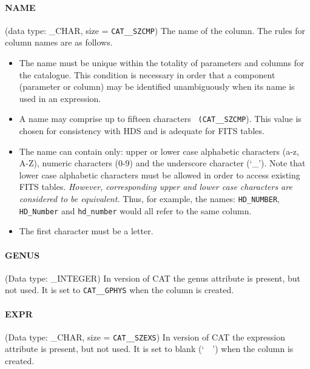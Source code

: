 \paragraph{NAME}
(data type: \_CHAR, size = {\tt CAT\_\_SZCMP})
The name of the column. The rules for column names are as follows.

\begin{itemize}

  \item The name must be unique within the totality of parameters and
   columns for the catalogue. This condition is necessary in order that
   a component (parameter or column) may be identified unambiguously
   when its name is used in an expression.

  \item A name may comprise up to fifteen characters {\tt
   (CAT\_\_SZCMP}). This value is chosen for consistency with HDS and
   is adequate for FITS tables.

  \item The name can contain only: upper or lower case alphabetic
   characters (a-z, A-Z), numeric characters (0-9) and the underscore
   character (`\_'). Note that lower case alphabetic characters must
   be allowed in order to access existing FITS tables. {\it However,
   corresponding upper and lower case characters are considered to be
   equivalent.} Thus, for example, the names: {\tt HD\_NUMBER}, {\tt
   HD\_Number} and {\tt hd\_number} would all refer to the same column.

  \item The first character must be a letter.

\end{itemize}

\paragraph{GENUS}
(Data type: \_INTEGER)
In version \CATversion of CAT the genus attribute is present, but not
used. It is set to {\tt CAT\_\_GPHYS} when the column is created.

\paragraph{EXPR}
(Data type: \_CHAR, size = {\tt CAT\_\_SZEXS})
In version \CATversion of CAT the expression attribute is present, but
not used. It is set to blank (`~~') when the column is created.

